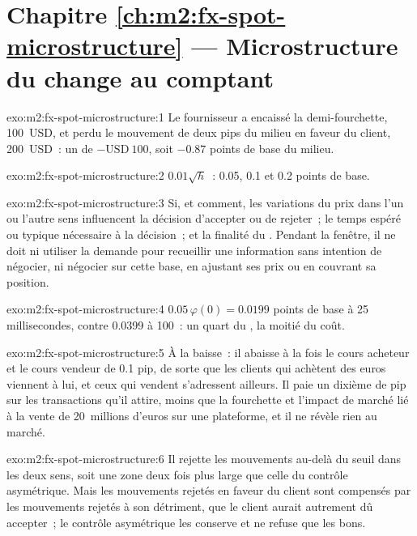 \section*{Chapitre \ref{ch:m2:fx-spot-microstructure} --- Microstructure du change au comptant}

\begin{solution}{exo:m2:fx-spot-microstructure:1}
Le fournisseur a encaissé la demi-fourchette, 100~USD, et perdu le mouvement de deux pips du
milieu en faveur du client, 200~USD~: un  de $-\text{USD}~100$, soit $-0.87$
points de base du milieu.
\end{solution}

\begin{solution}{exo:m2:fx-spot-microstructure:2}
$0.01\sqrt{h}$~: 0.05, 0.1 et 0.2 points de base.
\end{solution}

\begin{solution}{exo:m2:fx-spot-microstructure:3}
Si, et comment, les variations du prix dans l'un ou l'autre sens influencent la
décision d'accepter ou de rejeter~; le temps espéré ou typique nécessaire à la décision~; et
la finalité du . Pendant la fenêtre, il ne doit ni utiliser la demande pour recueillir
une information sans intention de négocier, ni négocier sur cette base, en ajustant ses
prix ou en couvrant sa position.
\end{solution}

\begin{solution}{exo:m2:fx-spot-microstructure:4}
$0.05\,\varphi(0) = 0.0199$ points de base à 25 millisecondes, contre 0.0399 à
100~: un quart du , la moitié du coût.
\end{solution}

\begin{solution}{exo:m2:fx-spot-microstructure:5}
À la baisse~: il abaisse à la fois le cours acheteur et le cours vendeur de 0.1 pip, de sorte que
les clients qui achètent des euros viennent à lui, et ceux qui vendent s'adressent ailleurs. Il paie un dixième de pip sur les transactions
qu'il attire, moins que la fourchette et l'impact de marché lié à la vente de 20~millions d'euros
sur une plateforme, et il ne révèle rien au marché.
\end{solution}

\begin{solution}{exo:m2:fx-spot-microstructure:6}
Il rejette les mouvements au-delà du seuil dans les deux sens, soit une zone deux fois plus large que
celle du contrôle asymétrique. Mais les mouvements rejetés en faveur du client sont compensés par les
mouvements rejetés à son détriment, que le client aurait autrement dû accepter~; le contrôle
asymétrique les conserve et ne refuse que les bons.
\end{solution}

